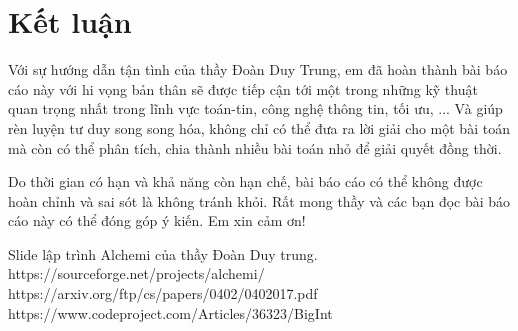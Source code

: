 \documentclass[12pt,a4paper]{report}
\begin{document}
\chapter*{Kết luận}                         %
Với sự hướng dẫn tận tình của thầy Đoàn Duy Trung, em đã hoàn thành bài báo cáo này với hi vọng bản thân sẽ được tiếp cận tới một trong những kỹ thuật quan trọng nhất trong lĩnh vực toán-tin, công nghệ thông tin, tối ưu, ... Và giúp rèn luyện tư duy song song hóa, không chỉ có thể đưa ra lời giải cho một bài toán mà còn có thể phân tích, chia thành nhiều bài toán nhỏ để giải quyết đồng thời.

Do thời gian có hạn và khả năng còn hạn chế, bài báo cáo có thể không được hoàn chỉnh và sai sót là không tránh khỏi. Rất mong thầy và các bạn đọc bài báo cáo này có thể đóng góp ý kiến. Em xin cảm ơn!


\begin{thebibliography}{99}               %
 Slide lập trình Alchemi của thầy Đoàn Duy trung.
 https://sourceforge.net/projects/alchemi/
 https://arxiv.org/ftp/cs/papers/0402/0402017.pdf
 https://www.codeproject.com/Articles/36323/BigInt

\end{thebibliography}
\end{document}
